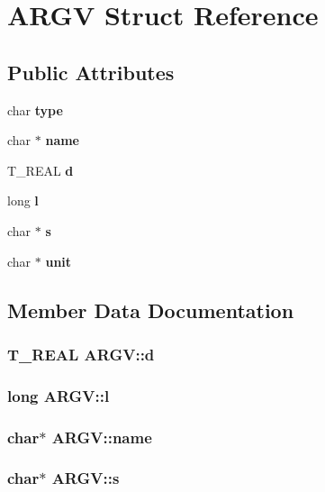 \section{ARGV Struct Reference}
\label{structARGV}
\subsection*{Public Attributes}
\begin{CompactItemize}
\item 
char {\bf type}
\item 
char $\ast$ {\bf name}
\item 
T\_\-REAL {\bf d}
\item 
long {\bf l}
\item 
char $\ast$ {\bf s}
\item 
char $\ast$ {\bf unit}
\end{CompactItemize}


\subsection{Member Data Documentation}
\subsubsection{\setlength{\rightskip}{0pt plus 5cm}T\_\-REAL {\bf ARGV::d}}\label{structARGV_o2}


\subsubsection{\setlength{\rightskip}{0pt plus 5cm}long {\bf ARGV::l}}\label{structARGV_o3}


\subsubsection{\setlength{\rightskip}{0pt plus 5cm}char$\ast$ {\bf ARGV::name}}\label{structARGV_o1}


\subsubsection{\setlength{\rightskip}{0pt plus 5cm}char$\ast$ {\bf ARGV::s}}\label{structARGV_o4}


